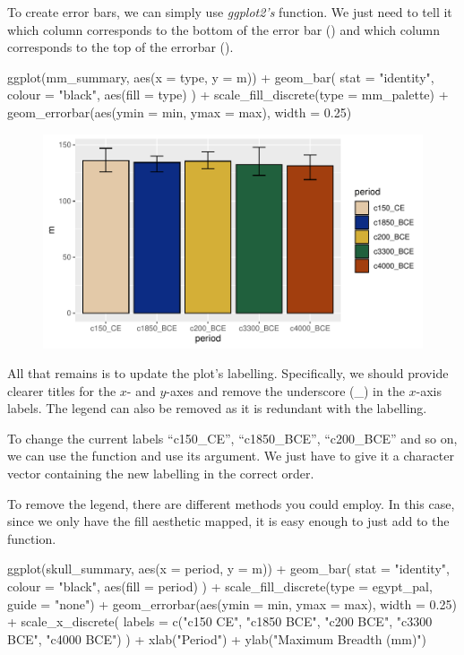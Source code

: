 To create error bars, we can simply use \textit{ggplot2's}  function. We just need to tell it which column corresponds to the bottom of the error bar () and which column corresponds to the top of the errorbar ().

\begin{inR}
ggplot(mm_summary, aes(x = type, y = m)) +
  geom_bar(
    stat = "identity",
    colour = "black",
    aes(fill = type)
  ) +
  scale_fill_discrete(type = mm_palette) +
  geom_errorbar(aes(ymin = min, ymax = max), width = 0.25)
\end{inR}

\vspace{2em}

\begin{figure}[H]
\includegraphics[scale = .75]{graphics/ch3Figs/bar_3.pdf}
\end{figure}

All that remains is to update the plot’s labelling. Specifically, we should provide clearer titles for the $x$- and $y$-axes and remove the underscore (\_) in the $x$-axis labels. The legend can also be removed as it is redundant with the labelling.

To change the current labels ``c150\_CE'', ``c1850\_BCE'', ``c200\_BCE'' and so on, we can use the function  and use its  argument. We just have to give it a character vector containing the new labelling in the correct order.

To remove the legend, there are different methods you could employ. In this case, since we only have the fill aesthetic mapped, it is easy enough to just add  to the  function.

\begin{inR}
ggplot(skull_summary, aes(x = period, y = m)) +
  geom_bar(
    stat = "identity",
    colour = "black",
    aes(fill = period)
  ) +
  scale_fill_discrete(type = egypt_pal, guide = "none") +
  geom_errorbar(aes(ymin = min, ymax = max), width = 0.25) +
  scale_x_discrete(
    labels = c("c150 CE", "c1850 BCE", "c200 BCE", "c3300 BCE", "c4000 BCE")
  ) +
  xlab("Period") +
  ylab("Maximum Breadth (mm)")
\end{inR}

